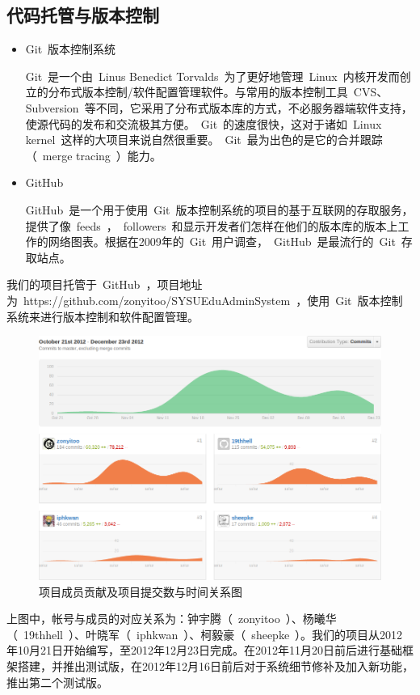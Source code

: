 \subsection{代码托管与版本控制}
\begin{itemize}
  \item Git~版本控制系统
  
  \CJKindent Git~是一个由~Linus Benedict Torvalds~为了更好地管理~Linux~内核开发而创立的分布式版本控制/软件配置管理软件。与常用的版本控制工具~CVS、Subversion~等不同，它采用了分布式版本库的方式，不必服务器端软件支持，使源代码的发布和交流极其方便。~Git~的速度很快，这对于诸如~Linux kernel~这样的大项目来说自然很重要。~Git~最为出色的是它的合并跟踪（~merge tracing~）能力。
  
  \item GitHub
  
  \CJKindent GitHub~是一个用于使用~Git~版本控制系统的项目的基于互联网的存取服务，提供了像~feeds~，~followers~和显示开发者们怎样在他们的版本库的版本上工作的网络图表。根据在2009年的~Git~用户调查，~GitHub~是最流行的~Git~存取站点。
\end{itemize}

我们的项目托管于~GitHub~，项目地址为~https://github.com/zonyitoo/SYSUEduAdminSystem~，使用~Git~版本控制系统来进行版本控制和软件配置管理。

\begin{figure}[H]
   \centering \includegraphics[width=\textwidth]{img/contrib.png}
   \caption{项目成员贡献及项目提交数与时间关系图}
\end{figure}

上图中，帐号与成员的对应关系为：钟宇腾（~zonyitoo~）、杨曦华（~19thhell~）、叶晓军（~iphkwan~）、柯毅豪（~sheepke~）。我们的项目从2012年10月21日开始编写，至2012年12月23日完成。在2012年11月20日前后进行基础框架搭建，并推出测试版，在2012年12月16日前后对于系统细节修补及加入新功能，推出第二个测试版。


